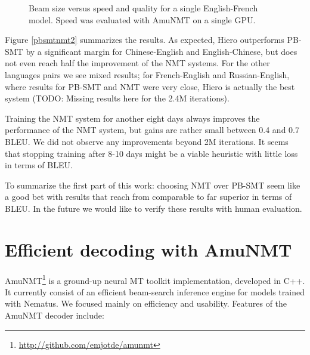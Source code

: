 \documentclass[11pt]{article}
\begin{document}
\begin{figure*}[t]
\centering
\caption{Beam size versus speed and quality for a single English-French model. Speed was evaluated with AmuNMT on a single GPU.}\label{beam}
\end{figure*}

Figure \ref{pbsmtnmt2} summarizes the results. As expected, Hiero outperforms PB-SMT by a significant margin for Chinese-English and English-Chinese, but does not even reach half the improvement of the NMT systems. For the other languages pairs we see mixed results; for French-English and Russian-English, where results for PB-SMT and NMT were very close, Hiero is actually the best system (TODO: Missing results here for the 2.4M iterations).

Training the NMT system for another eight days always improves the performance of the NMT system, but gains are rather small between 0.4 and 0.7 BLEU. We did not observe any improvements beyond 2M iterations. It seems that stopping training after 8-10 days might be a viable heuristic with little loss in terms of BLEU. 

To summarize the first part of this work: choosing NMT over PB-SMT seem like a good bet with results that reach from comparable to far superior in terms of BLEU. In the future we would like to verify these results with  human evaluation.

\section{Efficient decoding with AmuNMT}
AmuNMT\footnote{\url{http://github.com/emjotde/amunmt}} is a ground-up neural MT toolkit implementation, developed in C++. It currently consist of an efficient beam-search inference engine for models trained with Nematus. We focused mainly on efficiency and usability. Features of the AmuNMT decoder include:
\end{document}
